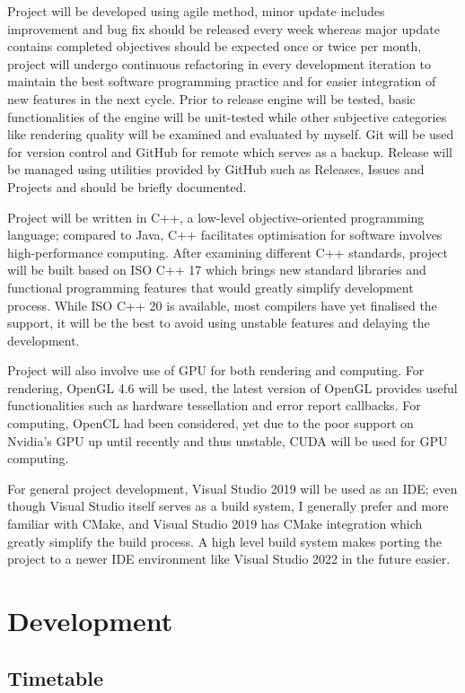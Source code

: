 \documentclass[oneside, a4paper]{article}
\begin{document}
    Project will be developed using agile method, minor update includes improvement and bug fix should be released every week whereas major update contains completed objectives should be expected once or twice per month, project will undergo continuous refactoring in every development iteration to maintain the best software programming practice and for easier integration of new features in the next cycle. Prior to release engine will be tested, basic functionalities of the engine will be unit-tested while other subjective categories like rendering quality will be examined and evaluated by myself. Git will be used for version control and GitHub for remote which serves as a backup. Release will be managed using utilities provided by GitHub such as Releases, Issues and Projects and should be briefly documented.

    Project will be written in C++, a low-level objective-oriented programming language; compared to Java, C++ facilitates optimisation for software involves high-performance computing. After examining different C++ standards, project will be built based on ISO C++ 17 which brings new standard libraries and functional programming features that would greatly simplify development process. While ISO C++ 20 is available, most compilers have yet finalised the support, it will be the best to avoid using unstable features and delaying the development.

    Project will also involve use of GPU for both rendering and computing. For rendering, OpenGL 4.6 will be used, the latest version of OpenGL provides useful functionalities such as hardware tessellation and error report callbacks. For computing, OpenCL had been considered, yet due to the poor support on Nvidia's GPU up until recently and thus unstable, CUDA will be used for GPU computing.

    For general project development, Visual Studio 2019 will be used as an IDE; even though Visual Studio itself serves as a build system, I generally prefer and more familiar with CMake, and Visual Studio 2019 has CMake integration which greatly simplify the build process. A high level build system makes porting the project to a newer IDE environment like Visual Studio 2022 in the future easier.

    \section{Development}

    \subsection{Timetable}
\end{document}
